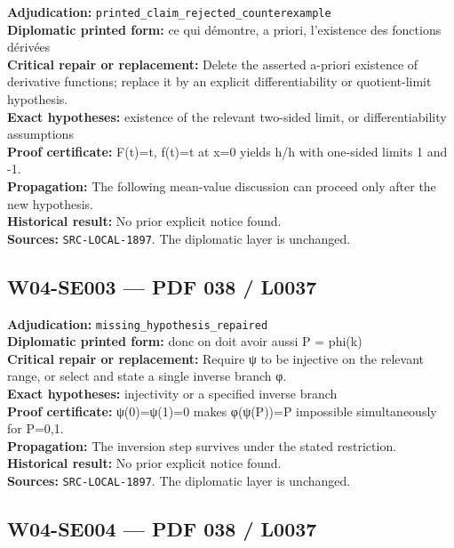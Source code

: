 \documentclass[
  10pt,
  a4paper,
]{scrreprt}
\begin{document}
\textbf{Adjudication:}
\texttt{printed\_claim\_rejected\_counterexample}\\
\textbf{Diplomatic printed form:} ce qui démontre, a priori, l'existence
des fonctions dérivées\\
\textbf{Critical repair or replacement:} Delete the asserted a-priori
existence of derivative functions; replace it by an explicit
differentiability or quotient-limit hypothesis.\\
\textbf{Exact hypotheses:} existence of the relevant two-sided limit, or
differentiability assumptions\\
\textbf{Proof certificate:} F(t)=\textbar t\textbar, f(t)=t at x=0
yields \textbar h\textbar/h with one-sided limits 1 and -1.\\
\textbf{Propagation:} The following mean-value discussion can proceed
only after the new hypothesis.\\
\textbf{Historical result:} No prior explicit notice found.\\
\textbf{Sources:} \texttt{SRC-LOCAL-1897}. The diplomatic layer is
unchanged.

\subsection{W04-SE003 --- PDF 038 /
L0037}\label{w04-se003-pdf-038-l0037}

\textbf{Adjudication:} \texttt{missing\_hypothesis\_repaired}\\
\textbf{Diplomatic printed form:} donc on doit avoir aussi P = phi(k)\\
\textbf{Critical repair or replacement:} Require ψ to be injective on
the relevant range, or select and state a single inverse branch φ.\\
\textbf{Exact hypotheses:} injectivity or a specified inverse branch\\
\textbf{Proof certificate:} ψ(0)=ψ(1)=0 makes φ(ψ(P))=P impossible
simultaneously for P=0,1.\\
\textbf{Propagation:} The inversion step survives under the stated
restriction.\\
\textbf{Historical result:} No prior explicit notice found.\\
\textbf{Sources:} \texttt{SRC-LOCAL-1897}. The diplomatic layer is
unchanged.

\subsection{W04-SE004 --- PDF 038 /
L0037}\label{w04-se004-pdf-038-l0037}
\end{document}
